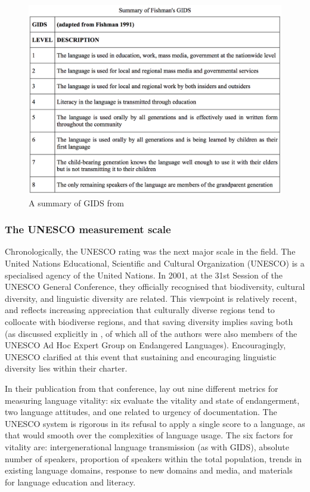\begin{figure}
 \centering
 \includegraphics[width=.8\textwidth]{img/gids.png}
 \caption{A summary of GIDS from \citep{lewis2010assessing}}
 \label{fig:gids}
\end{figure}

\subsubsection{The UNESCO measurement scale}
\label{subsec:unesco}

Chronologically, the UNESCO rating was the next major scale in the field. The United Nations Educational, Scientific and Cultural Organization (UNESCO) is a specialised agency of the United Nations. In 2001, at the 31st Session of the UNESCO General Conference, they officially recognised that biodiversity, cultural diversity, and linguistic diversity are related. This viewpoint is relatively recent, and reflects increasing appreciation that culturally diverse regions tend to collocate with biodiverse regions, and that saving diversity implies saving both \citep{nettle2000vanishing, maffi2001biocultural, anderson2006language, krauss2007keynote, gorenflo2012co} (as discussed explicitly in \citet{maffi2001}, of which all of the authors were also members of the UNESCO Ad Hoc Expert Group on Endangered Languages). Encouragingly, UNESCO clarified at this event that sustaining and encouraging linguistic diversity lies within their charter.

In their publication from that conference, \citet{brenzinger2003language} lay out nine different metrics for measuring language vitality: six evaluate the vitality and state of endangerment, two language attitudes, and one related to urgency of documentation. The UNESCO system is rigorous in its refusal to apply a single score to a language, as that would smooth over the complexities of language usage. The six factors for vitality are: intergenerational language transmission (as with GIDS), absolute number of speakers, proportion of speakers within the total population, trends in existing language domains, response to new domains and media, and materials for language education and literacy.

